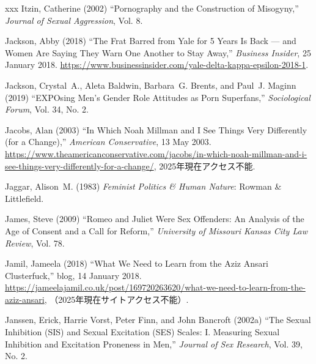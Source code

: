 \documentclass[]{jlreq} \usepackage{mystyle}
\begin{document}
\begin{thebibliography}{xxx}
Itzin, Catherine (2002) ``Pornography and the Construction of Misogyny,''
  \textit{ Journal of Sexual Aggression}, Vol. 8.

Jackson, Abby (2018) ``The Frat Barred from Yale for 5 Years Is Back --- and
  Women Are Saying They Warn One Another to Stay Away,'' \emph{Business
  Insider}, 25 January 2018.
  \url{https://www.businessinsider.com/yale-delta-kappa-epsilon-2018-1}.

Jackson, Crystal~A., Aleta Baldwin, Barbara~G. Brents, and Paul~J. Maginn
  (2019) ``EXPOsing Men's Gender Role Attitudes as Porn Superfans,'' \textit{
  Sociological Forum}, Vol. 34, No. 2.

Jacobs, Alan (2003) ``In Which Noah Millman and I See Things Very Differently
  (for a Change),'' \emph{American Conservative}, 13 May 2003.
  \url{https://www.theamericanconservative.com/jacobs/in-which-noah-millman-and-i-see-things-very-differently-for-a-change/},
  2025年現在アクセス不能.

Jaggar, Alison~M. (1983)  \textit{ Feminist Politics \& Human Nature}: Rowman
  \& Littlefield.

James, Steve (2009) ``Romeo and Juliet Were Sex Offenders: An Analysis of the
  Age of Consent and a Call for Reform,'' \textit{ University of Missouri
  Kansas City Law Review}, Vol. 78.

Jamil, Jameela (2018) ``What We Need to Learn from the Aziz Ansari
  Clusterfuck,'' blog, 14 January 2018.
  \url{https://jameelajamil.co.uk/post/169720263620/what-we-need-to-learn-from-the-aziz-ansari},
  （2025年現在サイトアクセス不能）.

Janssen, Erick, Harrie Vorst, Peter Finn, and John Bancroft (2002a) ``The
  Sexual Inhibition (SIS) and Sexual Excitation (SES) Scales: I. Measuring
  Sexual Inhibition and Excitation Proneness in Men,'' \textit{ Journal of Sex
  Research}, Vol. 39, No. 2.


\end{thebibliography}
\end{document}
